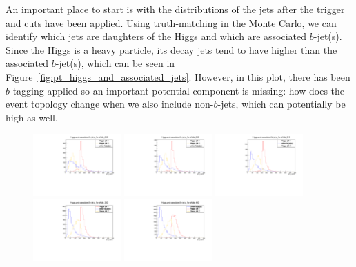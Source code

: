 An important place to start is with the \pt distributions of the jets after the trigger
and cuts have been applied.  Using truth-matching in the Monte Carlo, we can identify
which jets are daughters of the Higgs and which are associated $b$-jet(s).  Since
the Higgs is a heavy particle, its decay jets tend to have higher \pt than the associated
$b$-jet(s), which can be seen in Figure~\ref{fig:pt_higgs_and_associated_jets}. 
However, in this plot, there has been $b$-tagging applied so an important potential
component is missing: how does the event topology change when we also include 
non-$b$-jets, which can potentially be high \pt as well.   

\begin{figure}[H]
    \includegraphics[width=0.3\textwidth]{SignalKin/jet_pt_compare_bAbb_250.pdf}
    \includegraphics[width=0.3\textwidth]{SignalKin/jet_pt_compare_bAbb_280.pdf}
    \includegraphics[width=0.3\textwidth]{SignalKin/jet_pt_compare_bAbb_310.pdf}
    \newline
    \includegraphics[width=0.3\textwidth]{SignalKin/jet_pt_compare_bAbb_350.pdf}
    \includegraphics[width=0.3\textwidth]{SignalKin/jet_pt_compare_bAbb_400.pdf}

\end{figure}
